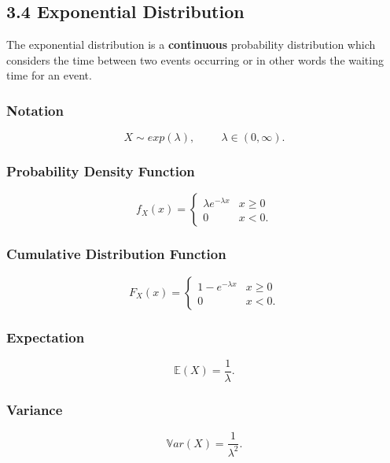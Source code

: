 \documentclass[11pt]{article}
\begin{document}
\subsection*{3.4 Exponential Distribution}
The exponential distribution is a \textbf{continuous} probability distribution which considers the time between two events occurring or in other words the waiting time for an event. 

\subsubsection*{Notation}
\begin{equation}
    X \sim exp(\lambda), \hspace{1cm} \lambda \in (0,\infty).
\end{equation}

\subsubsection*{Probability Density Function}
\begin{equation}
    f_X(x) = 
    \begin{cases} 
      \lambda e^{-\lambda x} & x \geq 0 \\
      0 & x < 0.
   \end{cases}
\end{equation}

\subsubsection*{Cumulative Distribution Function}
\begin{equation}
    F_X(x) = 
    \begin{cases} 
        1 - e^{-\lambda x} & x \geq 0 \\
        0 & x < 0.
   \end{cases}
\end{equation}

\subsubsection*{Expectation}
\begin{equation}
    \mathbb{E}(X) = \frac{1}{\lambda}.
\end{equation}

\subsubsection*{Variance}
\begin{equation}
    \mathbb{V}ar(X) = \frac{1}{\lambda^2}.
\end{equation}
\end{document}
